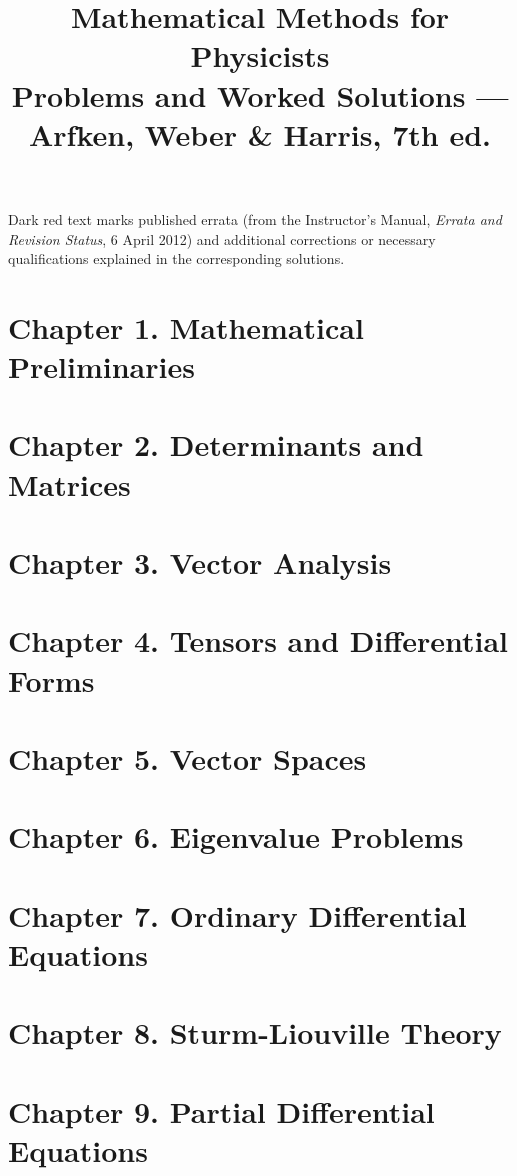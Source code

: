 \documentclass[11pt]{article}
\title{\textbf{Mathematical Methods for Physicists}\\[4pt]
\large Problems and Worked Solutions --- Arfken, Weber \& Harris, 7th ed.}
\author{}
\date{}
\begin{document}
\maketitle
\noindent\small Dark red text marks published errata (from the Instructor's
Manual, \emph{Errata and Revision Status}, 6 April 2012) and additional
corrections or necessary qualifications explained in the corresponding
solutions.\normalsize\par\medskip
\tableofcontents
\clearpage

\section{Chapter 1. Mathematical Preliminaries}

\clearpage
\section{Chapter 2. Determinants and Matrices}

\clearpage
\section{Chapter 3. Vector Analysis}

\clearpage
\section{Chapter 4. Tensors and Differential Forms}

\clearpage
\section{Chapter 5. Vector Spaces}

\clearpage
\section{Chapter 6. Eigenvalue Problems}

\clearpage
\section{Chapter 7. Ordinary Differential Equations}

\clearpage
\section{Chapter 8. Sturm-Liouville Theory}

\clearpage
\section{Chapter 9. Partial Differential Equations}

\clearpage
\end{document}

